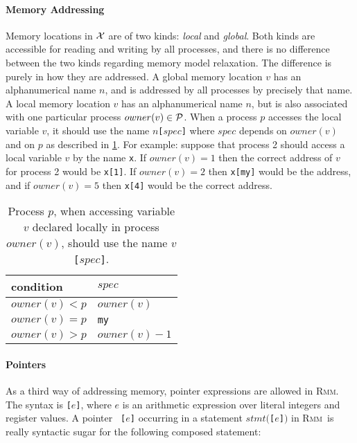 \documentclass[a4paper]{article}
\newcommand{\rmm}{\textsc{Rmm}}
\begin{document}
\paragraph{Memory Addressing}
Memory locations in $\mathcal{X}$ are of two kinds: \emph{local} and
\emph{global}. Both kinds are accessible for reading and writing by
all processes, and there is no difference between the two kinds
regarding memory model relaxation. The difference is purely in how
they are addressed. A global memory location $v$ has an alphanumerical
name $n$, and is addressed by all processes by precisely that name. A
local memory location $v$ has an alphanumerical name $n$, but is also
associated with one particular process $owner(v)\in\mathcal{P}$. When a
process $p$ accesses the local variable $v$, it should use the name
$n$\verb+[+$spec$\verb+]+ where $spec$ depends on $owner(v)$ and on
$p$ as described in \cref{tbl:locvarnames}. For example: suppose that
process 2 should access a local variable $v$ by the name \verb+x+. If
$owner(v) = 1$ then the correct address of $v$ for process 2 would be
\verb+x[1]+. If $owner(v) = 2$ then \verb+x[my]+ would be the address,
and if $owner(v) = 5$ then \verb+x[4]+ would be the correct address.

\begin{table}[ht]
  \begin{center}
    \begin{tabular}{|l|l|}
      \hline
      condition & $spec$\\
      \hline
      $owner(v) < p$ & $owner(v)$\\
      $owner(v) = p$ & \verb+my+\\
      $owner(v) > p$ & $owner(v)-1$\\
      \hline
    \end{tabular}
  \end{center}
  \caption{Process $p$, when accessing variable $v$ declared locally
    in process $owner(v)$, should use the name
    $v${\tt [}$spec${\tt ]}.}
  \label{tbl:locvarnames}
\end{table}

\paragraph{Pointers}
As a third way of addressing memory, pointer expressions are allowed
in \rmm. The syntax is {\tt [$e$]}, where $e$ is an arithmetic
expression over literal integers and register values. A pointer {\tt
  [$e$]} occurring in a statement $stmt(${\tt [$e$]}$)$ in \rmm\ is
really syntactic sugar for the following composed statement:
\end{document}
